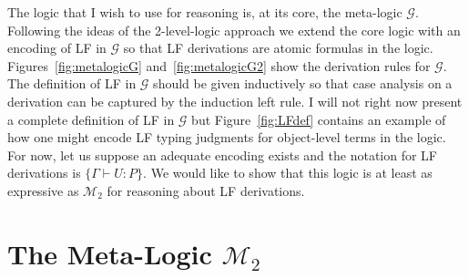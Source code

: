 \documentclass[12pt]{article}
\begin{document}
The logic that I wish to use for reasoning is, at its core, the meta-logic $\mathcal{G}$.
%
Following the ideas of the 2-level-logic approach we extend the core logic with an encoding
of LF in $\mathcal{G}$ so that LF derivations are atomic formulas in the logic.
%
Figures~\ref{fig:metalogicG} and~\ref{fig:metalogicG2} show the derivation rules 
for $\mathcal{G}$.
%
The definition of LF in $\mathcal{G}$ should be given inductively so that case 
analysis on a derivation can be captured by the induction left rule. 
%
I will not right now present a complete definition of LF in $\mathcal{G}$ but 
Figure~\ref{fig:LFdef} contains an example of how one might encode LF typing 
judgments for object-level terms in the logic.
%
For now, let us suppose an adequate encoding exists and the notation for LF 
derivations is $\{\Gamma\vdash U : P\}$.
%
We would like to show that this logic is at least as expressive as $\mathcal{M}_2$ 
for reasoning about LF derivations.

\section{The Meta-Logic $\mathcal{M}_2$}
\end{document}
